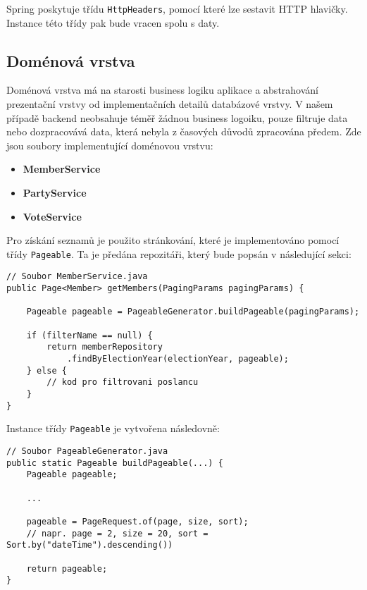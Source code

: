 \noindent Spring poskytuje třídu \lstinline|HttpHeaders|, pomocí které lze sestavit HTTP hlavičky. Instance této třídy pak bude vracen spolu s daty.

\subsection {Doménová vrstva}
Doménová vrstva má na starosti business logiku aplikace a abstrahování prezentační vrstvy od implementačních detailů databázové vrstvy. V našem případě backend neobsahuje téměř žádnou business logoiku, pouze filtruje data nebo dozpracovává data, která nebyla z časových důvodů zpracována předem. Zde jsou soubory implementující doménovou vrstvu:

\begin{itemize}
	\item \textbf{MemberService}
	\item \textbf{PartyService}
	\item \textbf{VoteService}
\end{itemize}

\noindent Pro získání seznamů je použito stránkování, které je implementováno pomocí třídy \lstinline|Pageable|. Ta je předána repozitáři, který bude popsán v následující sekci:

\begin{lstlisting}[caption={Ukázka doménové vrstvy pro vrácení seznamu poslanců}, label={lst:headers-paging}, tabsize=2]
// Soubor MemberService.java
public Page<Member> getMembers(PagingParams pagingParams) {
	
	Pageable pageable = PageableGenerator.buildPageable(pagingParams);
	
	if (filterName == null) {
		return memberRepository
			.findByElectionYear(electionYear, pageable);
	} else {
		// kod pro filtrovani poslancu
	}
}
\end{lstlisting}

\noindent Instance třídy \lstinline|Pageable| je vytvořena následovně:

\begin{lstlisting}[caption={Ukázka kódu pro sestavení objektu pro stránkování}, label={lst:paging-object}, tabsize=2]
// Soubor PageableGenerator.java
public static Pageable buildPageable(...) {
	Pageable pageable;
	
	...
	
	pageable = PageRequest.of(page, size, sort);
	// napr. page = 2, size = 20, sort = Sort.by("dateTime").descending())
	
	return pageable;
}

\end{lstlisting}

